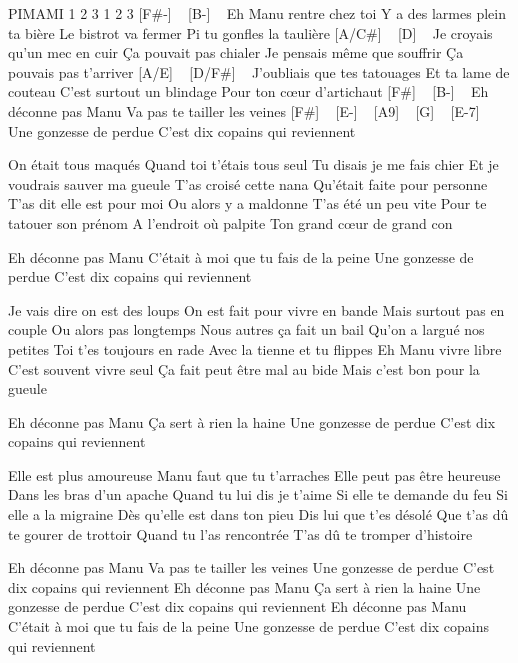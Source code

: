 PIMAMI
1 2 3 1 2 3
[F#-] ~ [B-] ~
Eh Manu rentre chez toi
Y a des larmes plein ta bière
Le bistrot va fermer
Pi tu gonfles la taulière
[A/C#] ~ [D] ~
Je croyais qu'un mec en cuir
Ça pouvait pas chialer
Je pensais même que souffrir
Ça pouvais pas t'arriver
[A/E] ~ [D/F#] ~
J'oubliais que tes tatouages
Et ta lame de couteau
C'est surtout un blindage
Pour ton cœur d'artichaut
[F#] ~ [B-] ~
Eh déconne pas Manu
Va pas te tailler les veines
[F#] ~ [E-] ~ [A9] ~ [G] ~ [E-7] ~
Une gonzesse de perdue
C'est dix copains qui reviennent

On était tous maqués
Quand toi t'étais tous seul
Tu disais je me fais chier
Et je voudrais sauver ma gueule
T'as croisé cette nana
Qu'était faite pour personne
T'as dit elle est pour moi
Ou alors y a maldonne
T'as été un peu vite
Pour te tatouer son prénom
A l'endroit où palpite
Ton grand cœur de grand con

Eh déconne pas Manu
C'était à moi que tu fais de la peine
Une gonzesse de perdue
C'est dix copains qui reviennent

Je vais dire on est des loups
On est fait pour vivre en bande
Mais surtout pas en couple
Ou alors pas longtemps
Nous autres ça fait un bail
Qu'on a largué nos petites
Toi t'es toujours en rade
Avec la tienne et tu flippes
Eh Manu vivre libre
C'est souvent vivre seul
Ça fait peut être mal au bide
Mais c'est bon pour la gueule

Eh déconne pas Manu
Ça sert à rien la haine
Une gonzesse de perdue
C'est dix copains qui reviennent

Elle est plus amoureuse
Manu faut que tu t'arraches
Elle peut pas être heureuse
Dans les bras d'un apache
Quand tu lui dis je t'aime
Si elle te demande du feu
Si elle a la migraine
Dès qu'elle est dans ton pieu
Dis lui que t'es désolé
Que t'as dû te gourer de trottoir
Quand tu l'as rencontrée
T'as dû te tromper d'histoire

Eh déconne pas Manu
Va pas te tailler les veines
Une gonzesse de perdue
C'est dix copains qui reviennent
Eh déconne pas Manu
Ça sert à rien la haine
Une gonzesse de perdue
C'est dix copains qui reviennent
Eh déconne pas Manu
C'était à moi que tu fais de la peine
Une gonzesse de perdue
C'est dix copains qui reviennent